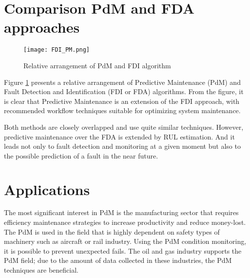 \section{Comparison PdM and FDA approaches}

\begin{figure}[h!]
    \centering
    \texttt{[image: FDI\_PM.png]}
    \caption{Relative arrangement of PdM and FDI algorithm \cite{fdi_cern2}}
    \label{fig:fdi_pm}
\end{figure}


Figure \ref{fig:fdi_pm} presents a relative arrangement of Predictive Maintenance
(PdM) and Fault Detection and Identification (FDI or FDA) algorithms. From
the figure, it is clear that Predictive Maintenance is an extension of the
FDI approach, with recommended workflow techniques suitable for optimizing
system maintenance.


Both methods are closely overlapped and use quite similar techniques.
However, predictive maintenance over the FDA is extended by RUL estimation.
And it leads not only to fault detection and monitoring at a given moment
but also to the possible prediction of a fault in the near future. 

\section{Applications}\label{sec:applications}

The most significant interest in PdM is the manufacturing sector that
requires efficiency maintenance strategies to increase productivity and
reduce money-lost. The PdM is used in the field that is highly dependent on
safety types of machinery such as aircraft or rail industry. Using the PdM
condition monitoring, it is possible to prevent unexpected fails. The oil
and gas industry supports the PdM field; due to the amount of data
collected in these industries, the PdM techniques are beneficial.
